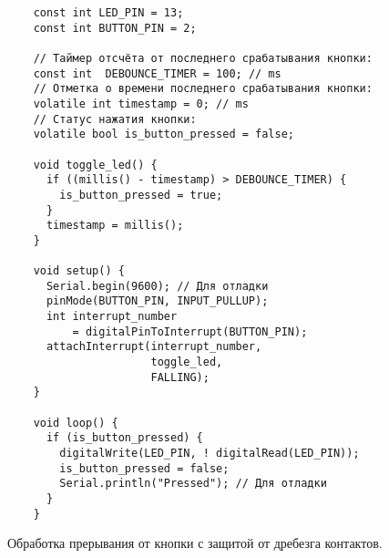 \documentclass[../sparc.tex]{subfiles}
\begin{document}
\begin{listing}[H]
  \begin{verbatim}
    const int LED_PIN = 13;
    const int BUTTON_PIN = 2;

    // Таймер отсчёта от последнего срабатывания кнопки:
    const int  DEBOUNCE_TIMER = 100; // ms
    // Отметка о времени последнего срабатывания кнопки:
    volatile int timestamp = 0; // ms
    // Статус нажатия кнопки:
    volatile bool is_button_pressed = false;

    void toggle_led() {
      if ((millis() - timestamp) > DEBOUNCE_TIMER) {
        is_button_pressed = true;
      }
      timestamp = millis();
    }

    void setup() {
      Serial.begin(9600); // Для отладки
      pinMode(BUTTON_PIN, INPUT_PULLUP);
      int interrupt_number
          = digitalPinToInterrupt(BUTTON_PIN);
      attachInterrupt(interrupt_number,
                      toggle_led,
                      FALLING);
    }

    void loop() {
      if (is_button_pressed) {
        digitalWrite(LED_PIN, ! digitalRead(LED_PIN));
        is_button_pressed = false;
        Serial.println("Pressed"); // Для отладки
      }
    }
  \end{verbatim}
  \caption{Обработка прерывания от кнопки с защитой от дребезга контактов.}
  \label{listing:interrupts-handler-button-debounce}
\end{listing}
\end{document}
